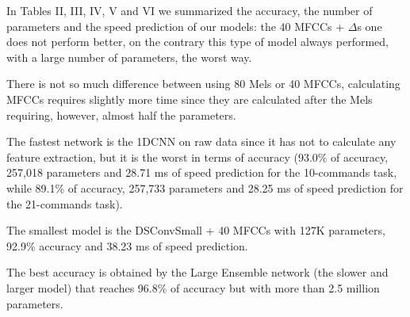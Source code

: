 \documentclass[conference]{IEEEtran}
\begin{document}
In Tables II, III, IV, V and VI we summarized the accuracy, the number of parameters and the speed prediction of our models: the 40 MFCCs + $\Delta$s one does not perform better, on the contrary this type of model always performed, with a large number of parameters, the worst way.

There is not so much difference between using 80 Mels or 40 MFCCs, calculating MFCCs requires slightly more time since they are calculated after the Mels requiring, however, almost half the parameters.

The fastest network is the 1DCNN on raw data since it has not to calculate any feature extraction, but it is the worst in terms of accuracy (93.0\% of accuracy, 257,018 parameters and 28.71 ms of speed prediction for the 10-commands task, while 89.1\% of accuracy, 257,733 parameters and 28.25 ms of speed prediction for the 21-commands task).

The smallest model is the DSConvSmall + 40 MFCCs with 127K parameters, 92.9\% accuracy and 38.23 ms of speed prediction.

The best accuracy is obtained by the Large Ensemble network (the slower and larger model) that reaches 96.8\% of accuracy but with more than 2.5 million parameters.

\begin{center}
\begin{table}[]
\begin{center}
\caption{1DCNN performances on 10 and 21-commands datasets.}
\end{center}
\end{table}
\end{center}
\end{document}
